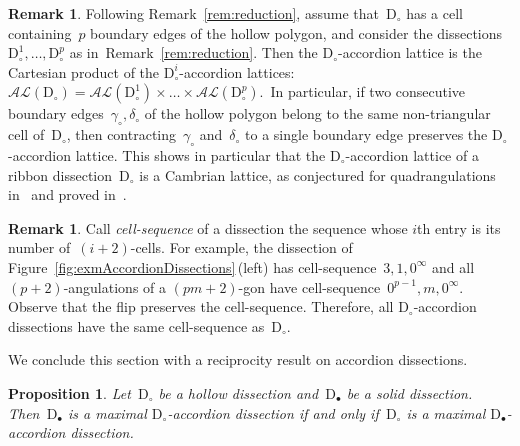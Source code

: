 \documentclass{amsart}
\newtheorem{proposition}[theorem]{Proposition}
\theoremstyle{definition}
\newtheorem{remark}[theorem]{Remark}
\newcommand{\fref}[1]{Figure~\ref{#1}} %
\newcommand{\darkblue}{\color{darkblue}} %
\newcommand{\defn}[1]{\textsl{\darkblue #1}} %
\newcommand{\accordionLattice}{\mathcal{AL}} %
\newcommand{\dissection}{\mathrm{D}} %
\begin{document}
\begin{remark}
Following Remark~\ref{rem:reduction}, assume that~$\dissection_\circ$ has a cell containing~$p$ boundary edges of the hollow polygon, and consider the dissections~$\dissection_\circ^1, \dots, \dissection_\circ^p$ as in~Remark~\ref{rem:reduction}. Then the $\dissection_\circ$-accordion lattice is the Cartesian product of the $\dissection_\circ^i$-accordion lattices:~${\accordionLattice(\dissection_\circ) = \accordionLattice(\dissection_\circ^1) \times \dots \times \accordionLattice(\dissection_\circ^p)}$.~In particular, if two consecutive boundary edges~$\gamma_\circ, \delta_\circ$ of the hollow polygon belong to the same non-triangular cell of~$\dissection_\circ$, then contracting~$\gamma_\circ$ and~$\delta_\circ$ to a single boundary edge preserves the \mbox{$\dissection_\circ$-accor}\-dion lattice. This shows in particular that the $\dissection_\circ$-accordion lattice of a ribbon dissection~$\dissection_\circ$ is a Cambrian lattice, as conjectured for quadrangulations in~\cite{Chapoton-quadrangulations} and proved in~\cite{BateniMannevillePilaud}.
\end{remark}

\begin{remark}
Call \defn{cell-sequence} of a dissection the sequence whose $i$th entry is its number \mbox{of~$(i+2)$-cells}. For example, the dissection of \fref{fig:exmAccordionDissections}\,(left) has cell-sequence~$3,1,0^\infty$ and all $(p+2)$-angulations of a $(pm+2)$-gon have cell-sequence~$0^{p-1},m,0^\infty$. Observe that the flip preserves the cell-sequence. Therefore, all $\dissection_\circ$-accordion dissections have the same cell-sequence as~$\dissection_\circ$.
\end{remark}

We conclude this section with a reciprocity result on accordion dissections.

\begin{proposition}
\label{prop:reciprocity}
Let~$\dissection_\circ$ be a hollow dissection and~$\dissection_\bullet$ be a solid dissection. Then~$\dissection_\bullet$ is a maximal $\dissection_\circ$-accordion dissection if and only if~$\dissection_\circ$ is a maximal $\dissection_\bullet$-accordion dissection.
\end{proposition}
\end{document}
